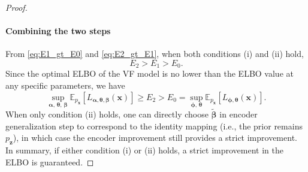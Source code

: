 \documentclass[10pt,a4paper]{amsart}
\newcommand{\mb}{\boldsymbol}
\begin{document}
\begin{proof}
\paragraph{Combining the two steps}
From \eqref{eq:E1_gt_E0} and \eqref{eq:E2_gt_E1}, when both conditions (i) and (ii) hold,
\begin{equation}
E_2 > E_1 > E_0.
\end{equation}
Since the optimal ELBO of the VF model is no lower than the ELBO value at any specific parameters, we have
\begin{equation}
\sup_{\mb{\alpha},\, \mb{\theta},\, \mb{\beta}} \mathbb{E}_{p_{\mb{x}}}[L_{\mb{\alpha},\mb{\theta},\mb{\beta}}(\mb{x})]
\geq E_2 > E_0
= \sup_{\mb{\phi},\, \mb{\theta}} \mathbb{E}_{p_{\mb{x}}}[L_{\mb{\phi},\mb{\theta}}(\mb{x})].
\end{equation}
When only condition (ii) holds, one can directly choose $\tilde{\mb{\beta}}$ in encoder generalization step to correspond to the identity mapping (i.e., the prior remains $p_{\mb{z}}$), in which case the encoder improvement still provides a strict improvement. In summary, if either condition (i) or (ii) holds, a strict improvement in the ELBO is guaranteed.
\end{proof}
\end{document}
